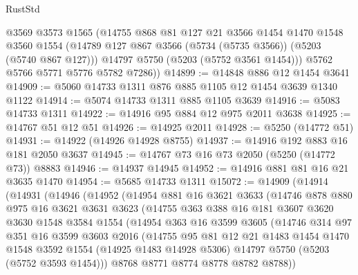 \begin{lexlean}{RustStd}
\begin{coremodule}
        @3569
        @3573
        @1565
        (@14755
          @868
          @81
          @127
          @21
          @3566
          @1454
          @1470
          @1548
          @3560
          @1554
          (@14789 @127 @867 @3566 (@5734 (@5735 @3566)) (@5203 (@5740 @867 @127)))
          @14797
          @5750
          (@5203 (@5752 @3561 @1454)))
        @5762
        @5766
        @5771
        @5776
        @5782
        @7286))
@14899 := @14848 @886 @12 @1454 @3641
@14909 := @5060 @14733 @1311 @876 @885 @1105 @12 @1454 @3639 @1340 @1122
@14914 := @5074 @14733 @1311 @885 @1105 @3639
@14916 := @5083 @14733 @1311
@14922 := @14916 @95 @884 @12 @975 @2011 @3638
@14925 := @14767 @51 @12 @51
@14926 := @14925 @2011
@14928 := @5250 (@14772 @51)
@14931 := @14922 (@14926 @14928 @8755)
@14937 := @14916 @192 @883 @16 @181 @2050 @3637
@14945 := @14767 @73 @16 @73 @2050 (@5250 (@14772 @73)) @8883
@14946 := @14937 @14945
@14952 := @14916 @881 @81 @16 @21 @3635 @1470
@14954 := @5685 @14733 @1311
@15072 := @14909
    (@14914
      (@14931
        (@14946
          (@14952
            (@14954
              @881
              @16
              @3621
              @3633
              (@14746
                @878
                @880
                @975
                @16
                @3621
                @3631
                @3623
                (@14755
                  @363
                  @388
                  @16
                  @181
                  @3607
                  @3620
                  @3630
                  @1548
                  @3584
                  @1554
                  (@14954
                    @363
                    @16
                    @3599
                    @3605
                    (@14746
                      @314
                      @97
                      @351
                      @16
                      @3599
                      @3603
                      @2016
                      (@14755
                        @95
                        @81
                        @12
                        @21
                        @1483
                        @1454
                        @1470
                        @1548
                        @3592
                        @1554
                        (@14925 @1483 @14928 @5306)
                        @14797
                        @5750
                        (@5203 (@5752 @3593 @1454)))
                      @8768
                      @8771
                      @8774
                      @8778
                      @8782
                      @8788))

\end{coremodule}
\end{lexlean}
